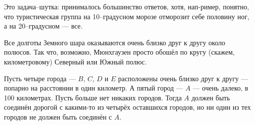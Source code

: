 \begin{itemize}
\itA Это задача–шутка: принималось большинство ответов, хотя, нап-\linebreak ример, понятно, что туристическая группа на 10--градусном морозе отморозит себе половину ног, а на 20--градусном — все.

\itB Все долготы Земного шара оказываются очень близко друг к другу около полюсов. Так что, возможно, Мюнхгаузен просто обошёл по кругу (скажем, километровому) Северный или Южный полюс.

\itC Пусть четыре города — $B$, $C$, $D$ и $E$ расположены очень близко друг к другу — попарно на расстоянии в один километр. А пятый город — $A$ — очень далеко, в 100 километрах. Пусть больше нет никаких городов. Тогда $A$ должен быть соединён дорогой с какими-то из  четырёх оставшихся городов, но ни один из тех городов не должен быть соединён с $A$.
\end{itemize}